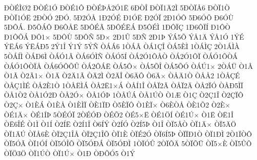 {^^d0^^d2^^c9^^cc^^d82
^^d0^^d2^^c91^^d3
^^d0^^d2^^c91^^d4
^^d0^^d2^^c9^^de^^c52^^d31^^cb
6^^d0^^d2^^ce
^^d0^^d2^^cf1^^c42^^cc
5^^d0^^d2^^cf^^c56
^^d0^^d2^^cf1^^d2
^^d0^^d2^^cf1^^d3^^cb
2^^d0^^d2^^d3
2^^d0^^d3.
5^^d02^^d3^^c5
1^^d02^^d3^^c9
^^d01^^d3^^cb
^^d02^^d3^^cf
2^^d01^^d3^^d4
5^^d06^^d3^^d5
^^d06^^d3^^d9
5^^d0^^d4^^c1.
^^d05^^d4^^c1^^d4
^^d06^^d4^^c5^^cb
5^^d0^^d4^^c9^^c3
5^^d0^^d4^^c9^^cb^^c1
^^d05^^d4^^c9^^cc
1^^d0^^d4^^cf^^c7
1^^d06^^d4^^cf^^cd
^^d01^^d4^^d2
^^d01^^d4^^d5^^c1
^^d0^^d41^^d7
5^^d0^^d4^^d9
5^^d0^^d4^^d1
5^^d0^^d7
2^^d01^^db
5^^d0^^d1
2^^d01^^de
^^dd^^c15^^d5
^^dd^^c51^^c4
^^dd^^c51^^d3
1^^dd^^c9
^^dd^^cb^^c16
^^dd^^cb^^c1^^d05
2^^dd1^^ce
^^dd1^^dd
5^^dd^^d1
^^d2^^c1^^c16
1^^d2^^c1^^c2
^^d2^^c11^^c7^^ce
^^d2^^c15^^c8^^cc
1^^d2^^c1^^cc^^c7
2^^d21^^c1^^cc^^c0
5^^d2^^c1^^cd^^cc
^^d2^^c1^^d06^^cc
^^d2^^c1^^d31^^c2
^^d2^^c16^^d3^^cc^^d1
^^d2^^c1^^d35^^cd
^^d2^^c12^^d31^^d4^^c5^^d2
^^d2^^c12^^d31^^d4^^cf
^^d2^^c1^^d31^^d4^^d2^^c1
^^d2^^c1^^d31^^d4^^d2^^cf^^c5
^^d2^^c16^^d3^^d4^^d5^^db
^^d2^^c12^^d4^^c1^^cb
^^d2^^c15^^d4^^d7
^^d2^^c15^^d5^^ce
^^d2^^c15^^d5^^d3
^^d2^^c1^^da1^^d7
2^^d2^^c1^^dc
^^d21^^c2
^^d21^^c3
^^d22^^c31^^d7
^^d21^^c4
^^d22^^c41^^c3
^^d2^^c42^^cc
^^d22^^c4^^ce
^^d26^^c4^^d4
^^d26^^c4^^d7
^^d2^^c5^^c41^^d2
^^d2^^c5^^c52
1^^d2^^c5^^c7^^c9
^^d2^^c5^^c71^^cc^^c9
^^d2^^c52^^c81^^d2
1^^d2^^c5^^cb^^cc^^c1
^^d2^^c52^^cb1^^d7^^c1
^^d2^^c5^^cd1^^ce
^^d2^^c5^^cf2^^c3
^^d2^^c5^^cf2^^c4
^^d2^^c52^^cf^^d3
^^d2^^c5^^d05^^cc^^cf
^^d2^^c51^^d22
^^d2^^c51^^d32^^d0
^^d2^^c52^^d3^^d7
^^d2^^c51^^d3^^de
1^^d2^^c5^^da^^c1
^^d2^^c51^^da^^d2
^^d21^^c6
^^d21^^c7
^^d22^^c71^^ce
^^d22^^c7^^cf^^d4
^^d22^^c7^^d7
^^d21^^c8^^c1
^^d21^^c8^^c5
^^d21^^c8^^cc^^cf
^^d2^^c81^^cf^^d0
^^d25^^c8^^cf^^d4
^^d21^^c8^^cf^^d7
^^d26^^c8^^d2^^c5
^^d2^^c81^^d52
^^d22^^c8^^d7
^^d2^^c91^^c4^^d7
^^d2^^c91^^cd^^de
5^^d2^^c9^^d3^^cf
2^^d2^^c9^^d3^^d0
^^d2^^c9^^d52
^^d2^^c95^^d7^^cb
^^d2^^c91^^d6^^cd
^^d2^^c91^^da^^d7
^^d21^^cb
^^d2^^cb1^^ce
^^d2^^cb6^^ce^^c9
^^d21^^cc
^^d21^^cd
^^d22^^cd^^cb
^^d22^^cd1^^ce
^^d26^^cd^^dd
^^d22^^cd^^d3
^^d22^^cd5^^de
^^d21^^ce
^^d2^^cf5^^c2^^d2
^^d2^^cf1^^c4^^d7
^^d2^^cf5^^c4^^d6
^^d2^^cf1^^c4^^da
^^d2^^cf^^c56^^c8
^^d2^^cf2^^c71^^ce^^c5
^^d2^^cf2^^c71^^ce^^d5
^^d2^^cf1^^c8
^^d2^^cf^^c92^^d3
^^d2^^cf6^^cd5^^de
^^d2^^cf^^cf^^d01^^d2
^^d2^^cf1^^d0^^cc
2^^d21^^cf^^d2^^d4
^^d2^^cf5^^d3^^c3
^^d2^^cf1^^d3^^cd
^^d2^^cf5^^d3^^ce^^d5
^^d2^^cf5^^d3^^d0^^c1
^^d2^^cf5^^d3^^d0^^cc
1^^d2^^cf^^d3^^db
2^^d2^^cf^^d4^^c4
5^^d2^^cf^^d5^^dc
^^d2^^cf5^^d7^^c8
^^d2^^cf5^^db^^d4
^^d2^^cf^^d63^^d6
^^d2^^cf1^^da^^d2
^^d2^^cf1^^da^^d7
^^d21^^d0
^^d2^^d0^^d5^^d35
^^d21^^dd
}
